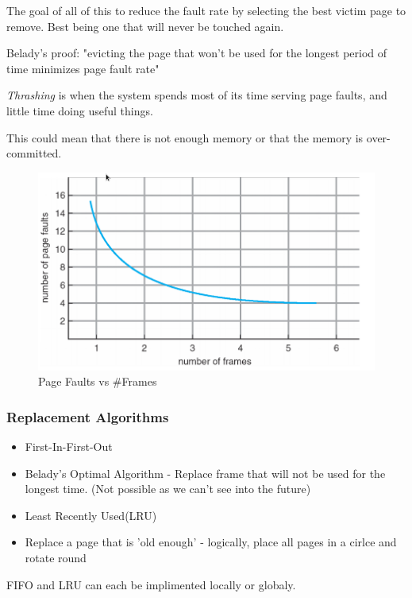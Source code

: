 \documentclass[a4]{article}
\begin{document}
The goal of all of this to reduce the fault rate by selecting the best victim page to remove.
Best being one that will never be touched again.

Belady's proof:
"evicting the page that won’t be used for the longest period of time minimizes page fault rate"

\emph{Thrashing} is when the system spends most of its time serving page faults, and little time doing useful things.

This could mean that there is not enough memory or that the memory is over-committed.

\begin{figure}[H]
  \centering
  \includegraphics[scale=0.35]{pageFaultGraph.png}
  \caption{Page Faults vs \#Frames}
\end{figure}

\subsubsection{Replacement Algorithms}
\begin{itemize}
    \item First-In-First-Out
    \item Belady's Optimal Algorithm - Replace frame that will not be used for the longest time.
        (Not possible as we can't see into the future)
    \item Least Recently Used(LRU)
    \item Replace a page that is 'old enough' - logically, place all pages in a cirlce and rotate round

\end{itemize}

\vspace{0.5cm}

FIFO and LRU can each be implimented locally or globaly.
\end{document}
